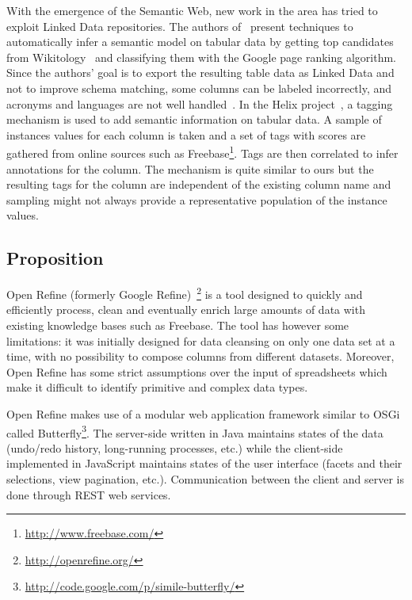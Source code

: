 With the emergence of the Semantic Web, new work in the area has tried to exploit Linked Data repositories. The authors of~\cite{Syed:WebSci:10} present techniques to automatically infer a semantic model on tabular data by getting top candidates from Wikitology~\cite{Finin:AAAI:09} and classifying them with the Google page ranking algorithm. Since the authors' goal is to export the resulting table data as Linked Data and not to improve schema matching, some columns can be labeled incorrectly, and acronyms and languages are not well handled~\cite{Syed:WebSci:10}. In the Helix project~\cite{Hassanzadeh:WWW:11}, a tagging mechanism is used to add semantic information on tabular data. A sample of instances values for each column is taken and a set of tags with scores are gathered from online sources such as Freebase\footnote{\url{http://www.freebase.com/}}. Tags are then correlated to infer annotations for the column. The mechanism is quite similar to ours but the resulting tags for the column are independent of the existing column name and sampling might not always provide a representative population of the instance values.


\subsection{Proposition}\label{Section:RUBIX}

Open Refine (formerly Google Refine)~\footnote{\url{http://openrefine.org/}} is a tool designed to quickly and efficiently process, clean and eventually enrich large amounts of data with existing knowledge bases such as Freebase. The tool has however some limitations: it was initially designed for data cleansing on only one data set at a time, with no possibility to compose columns from different datasets. Moreover, Open Refine has some strict assumptions over the input of spreadsheets which make it difficult to identify primitive and complex data types.

Open Refine makes use of a modular web application framework similar to OSGi called Butterfly\footnote{\url{http://code.google.com/p/simile-butterfly/}}. The server-side written in Java maintains states of the data (undo/redo history, long-running processes, etc.) while the client-side implemented in JavaScript maintains states of the user interface (facets and their selections, view pagination, etc.). Communication between the client and server is done through REST web services.

